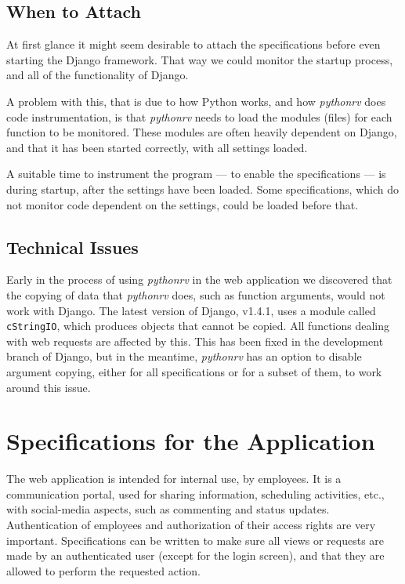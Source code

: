 \subsection{When to Attach}

At first glance it might seem desirable to attach the specifications before
even starting the Django framework. That way we could monitor the startup
process, and all of the functionality of Django.

A problem with this, that is due to how Python works, and how \textit{pythonrv}
does code instrumentation, is that \textit{pythonrv} needs to load the modules
(files) for each function to be monitored. These modules are often heavily
dependent on Django, and that it has been started correctly, with all settings
loaded.

A suitable time to instrument the program --- to enable the specifications ---
is during startup, after the settings have been loaded. Some specifications,
which do not monitor code dependent on the settings, could be loaded before
that.


\subsection{Technical Issues}

Early in the process of using \textit{pythonrv} in the web application we
discovered that the copying of data that \textit{pythonrv} does, such as
function arguments, would not work with Django. The latest version of Django,
v1.4.1, uses a module called \texttt{cStringIO}, which produces objects that
cannot be copied. All functions dealing with web requests are affected by this.
This has been fixed in the development branch of Django, but in the meantime,
\textit{pythonrv} has an option to disable argument copying, either for all
specifications or for a subset of them, to work around this issue.


\section{Specifications for the Application}

The web application is intended for internal use, by employees. It is a
communication portal, used for sharing information, scheduling activities,
etc., with social-media aspects, such as commenting and status updates.
Authentication of employees and authorization of their access rights are very
important. Specifications can be written to make sure all views or requests
are made by an authenticated user (except for the login screen), and that they
are allowed to perform the requested action.


